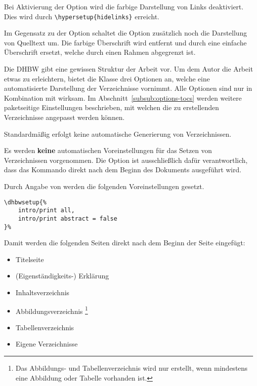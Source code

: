 \documentclass[babel=ngerman,highlight=false]{skdoc}
\begin{document}
                Bei Aktivierung der Option wird die farbige Darstellung von Links deaktiviert. Dies wird durch \verb|\hypersetup{hidelinks}| erreicht.\medskip
                
                Im Gegensatz zu der Option  schaltet die Option zusätzlich noch die Darstellung von Quelltext um. Die farbige Überschrift wird entfernt und durch eine einfache Überschrift ersetzt, welche durch einen Rahmen abgegrenzt ist.\bigskip
                
                Die DHBW gibt eine gewissen Struktur der Arbeit vor. Um dem Autor die Arbeit etwas zu erleichtern, bietet die Klasse drei Optionen an, welche eine automatisierte Darstellung der Verzeichnisse vornimmt. Alle Optionen sind nur in Kombination mit  wirksam. Im Abschnitt~\ref{subsub:options-tocs} werden weitere paketseitige Einstellungen beschrieben, mit welchen die zu erstellenden Verzeichnisse angepasst werden können.\medskip
                
                Standardmäßig erfolgt keine automatische Generierung von Verzeichnissen.
                
                Es werden \textbf{keine} automatischen Voreinstellungen für das Setzen von Verzeichnissen vorgenommen. Die Option ist ausschließlich dafür verantwortlich, dass das Kommando  direkt nach dem Beginn des Dokuments ausgeführt wird.\medskip
                
                Durch Angabe von  werden die folgenden Voreinstellungen gesetzt.
                \begin{verbatim}
\dhbwsetup{%
    intro/print all,
    intro/print abstract = false
}%
                \end{verbatim}
                Damit werden die folgenden Seiten direkt nach dem Beginn der Seite eingefügt:
                \begin{itemize}
                    \item Titelseite
                    \item (Eigenständigkeits-) Erklärung
                    \item Inhaltsverzeichnis
                    \item Abbildungsverzeichnis \footnote{Das Abbildungs- und Tabellenverzeichnis wird nur erstellt, wenn mindestens eine Abbildung oder Tabelle vorhanden ist.}
                    \item Tabellenverzeichnis
                    \item Eigene Verzeichnisse
                \end{itemize}
                
\end{document}
